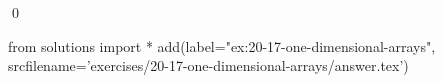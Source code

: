 
\begin{ex}
  \label{ex:20-17-one-dimensional-arrays}
  
  \qed
\end{ex}
\begin{python0}
from solutions import *
add(label="ex:20-17-one-dimensional-arrays",
    srcfilename='exercises/20-17-one-dimensional-arrays/answer.tex')
\end{python0}
